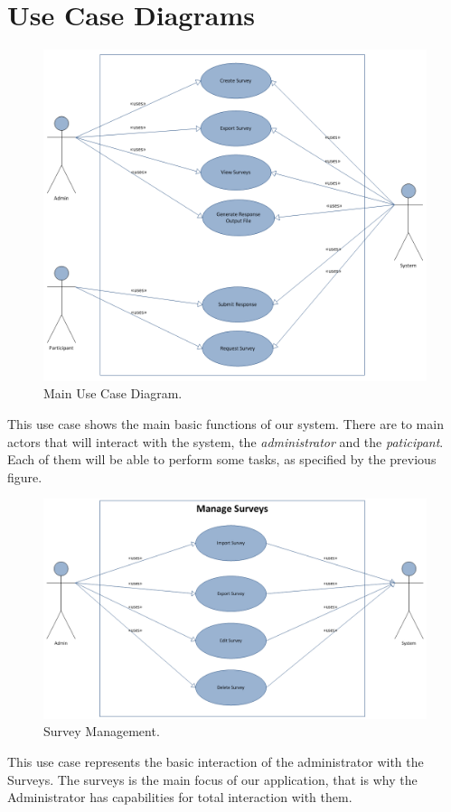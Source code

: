 \documentclass[a4paper,12pt,oneside]{report}
\begin{document}
\section{Use Case Diagrams}
\vskip 2cm
\begin{figure}[h!]
  \begin{center}
   \includegraphics[width=13.9cm]{pics/usecase.png}
  \end{center}
\caption{Main Use Case Diagram.}
\end{figure}
\vskip 1cm
This use case shows the main basic functions of our system. There are to main actors that will interact with the system, the \emph{administrator} and the \emph{paticipant}. Each of them will be able to perform some tasks, as specified by the previous figure.

\newpage
\begin{figure}[h!]
  \begin{center}
\vskip 2cm
   \includegraphics[width=13.8cm]{pics/manageSurveys.png}
  \end{center}
\caption{Survey Management.}
\end{figure}
\vskip 2cm
This use case represents the basic interaction of the administrator with the Surveys. The surveys is the main focus of our application, that is why the Administrator has capabilities for total interaction with them.
\end{document}
